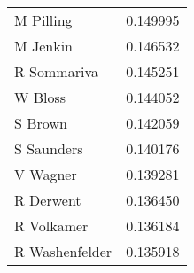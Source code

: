 \begin{table}[H] \centering\begin{tabular}{lr}
\toprule
      \hphantom{ } M Pilling &  0.149995 \\
       \hphantom{ } M Jenkin &  0.146532 \\
    \hphantom{ } R Sommariva &  0.145251 \\
        \hphantom{ } W Bloss &  0.144052 \\
        \hphantom{ } S Brown &  0.142059 \\
     \hphantom{ } S Saunders &  0.140176 \\
       \hphantom{ } V Wagner &  0.139281 \\
      \hphantom{ } R Derwent &  0.136450 \\
     \hphantom{ } R Volkamer &  0.136184 \\
 \hphantom{ } R Washenfelder &  0.135918 \\
\bottomrule
\end{tabular}

    \label{tab:closeness_Author}
    \end{table}

    